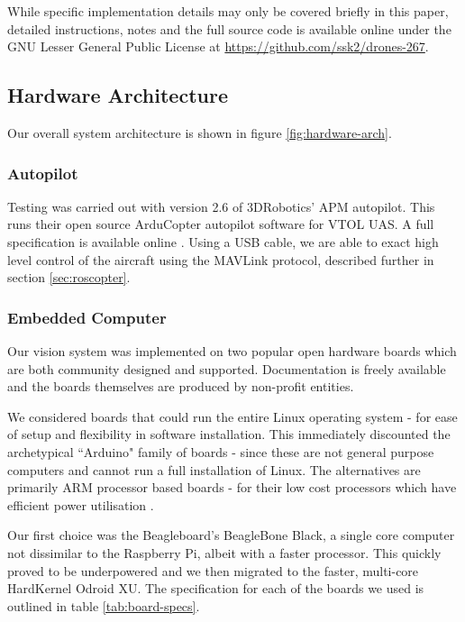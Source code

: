 \documentclass{acm_proc_article-sp}
\begin{document}
While specific implementation details may only be covered briefly in this paper, detailed instructions, notes and the full source code is available online under the GNU Lesser General Public License at \url{https://github.com/ssk2/drones-267}.

\subsection{Hardware Architecture}

Our overall system architecture is shown in figure \ref{fig:hardware-arch}.

\subsubsection{Autopilot}
Testing was carried out with version 2.6 of 3DRobotics' APM autopilot. This runs their open source ArduCopter autopilot software for VTOL UAS. A full specification is available online \cite{arducopter}. Using a USB cable, we are able to exact high level control of the aircraft using the MAVLink protocol, described further in section \ref{sec:roscopter}.

\subsubsection{Embedded Computer}
Our vision system was implemented on two popular open hardware boards which are both community designed and supported. Documentation is freely available and the boards themselves are produced by non-profit entities. 

We considered boards that could run the entire Linux operating system - for ease of setup and flexibility in software installation. This immediately discounted the archetypical ``Arduino" family of boards - since these are not general purpose computers and cannot run a full installation of Linux. The alternatives are primarily ARM processor based boards - for their low cost processors which have efficient power utilisation \cite{roberts2009arm}.

Our first choice was the Beagleboard's BeagleBone Black, a single core computer not dissimilar to the Raspberry Pi, albeit with a faster processor. This quickly proved to be underpowered and we then migrated to the faster, multi-core HardKernel Odroid XU. The specification for each of the boards we used is outlined in table \ref{tab:board-specs}.
\end{document}
